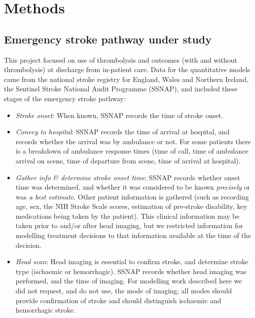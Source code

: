 \section{Methods}

\subsection{Emergency stroke pathway under study}

This project focused on use of thrombolysis and outcomes (with and without thrombolysis) at discharge from in-patient care. Data for the quantitative models came from the national stroke registry for England, Wales and Northern Ireland, the Sentinel Stroke National Audit Programme (SSNAP), and included these stages of the emergency stroke pathway:

\begin{itemize}

    \item \textit{Stroke onset}: When known, SSNAP records the time of stroke onset.

    \item \textit{Convey to hospital}: SSNAP records the time of arrival at hospital, and records whether the arrival was by ambulance or not. For some patients there is a breakdown of ambulance response times (time of call, time of ambulance arrival on scene, time of departure from scene, time of arrival at hospital).

    \item \textit{Gather info \& determine stroke onset time}: SSNAP records whether onset time was determined, and whether it was considered to be known \textit{precisely} or was \textit{a best estimate}. Other patient information is gathered (such as recording age, sex, the NIH Stroke Scale scores, estimation of pre-stroke disability, key medications being taken by the patient). This clinical information may be taken prior to and/or after head imaging, but we restricted information for modelling treatment decisions to that information available at the time of the decision.

    \item \textit{Head scan}: Head imaging is essential to confirm stroke, and determine stroke type (ischaemic or hemorrhagic). SSNAP records whether head imaging was performed, and the time of imaging. For modelling work described here we did not request, and do not use, the mode of imaging; all modes should provide confirmation of stroke and should distinguish ischaemic and hemorrhagic stroke. 


\end{itemize}
